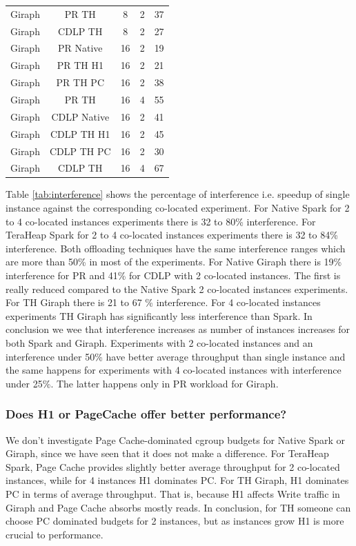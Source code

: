 \begin{table}[thbp]
\begin{tabular}{|c|c|c|c|c|}
	  Giraph & PR TH & 8 & 2 & 37 \\
	  Giraph & CDLP TH & 8 & 2 & 27 \\
          Giraph & PR Native & 16 & 2 & 19 \\
          Giraph & PR TH H1 & 16 & 2 & 21 \\
          Giraph & PR TH PC & 16 & 2 & 38 \\
          Giraph & PR TH & 16 & 4 & 55 \\
          Giraph & CDLP Native & 16 & 2 & 41 \\
          Giraph & CDLP TH H1 & 16 & 2 & 45 \\
          Giraph & CDLP TH PC & 16 & 2 & 30 \\
          Giraph & CDLP TH & 16 & 4 & 67 \\
    \hline
  \end{tabular}
\end{table}


Table \ref{tab:interference} shows the percentage of interference i.e. speedup of single instance against the corresponding co-located experiment. For Native Spark for 2 to 4 co-located instances experiments there is 32 to 80\% interference. For TeraHeap Spark for 2 to 4 co-located instances experiments there is 32 to 84\% interference. Both offloading techniques have the same interference ranges which are more than 50\% in most of the experiments. For Native Giraph there is 19\% interference for PR and 41\% for CDLP with 2 co-located instances. The first is really reduced compared to the Native Spark 2 co-located instances experiments. For TH Giraph there is 21 to 67 \% interference. For 4 co-located instances experiments TH Giraph has significantly less interference than Spark. In conclusion we wee that interference increases as number of instances increases for both Spark and Giraph. Experiments with 2 co-located instances and an interference under 50\% have better average throughput than single instance and the same happens for experiments with 4 co-located instances with interference under 25\%. The latter happens
only in PR workload for Giraph.

\subsubsection{Does H1 or PageCache offer better performance?}
We don't investigate Page Cache-dominated cgroup budgets for Native Spark or Giraph, since we have seen that it does not make a difference. For TeraHeap Spark, Page Cache provides slightly better average throughput for 2 co-located instances, while for 4 instances H1 dominates PC. For TH Giraph, H1 dominates PC in terms of average throughput. That is, because H1 affects Write traffic in Giraph and Page Cache absorbs mostly reads. In conclusion, for TH someone can choose PC dominated budgets for 2 instances, but as instances grow H1 is more crucial to performance.

